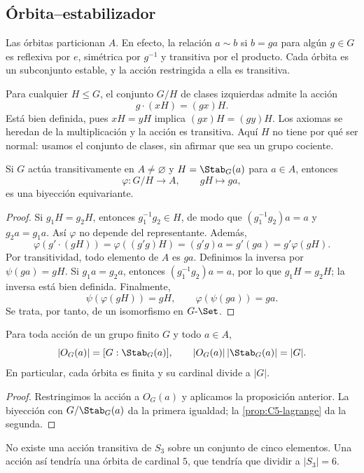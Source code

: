 \subsection{Órbita--estabilizador}
Las órbitas particionan $A$. En efecto, la relación $a\sim b$ si $b=ga$ para algún $g\in G$ es reflexiva por $e$, simétrica por $g^{-1}$ y transitiva por el producto. Cada órbita es un subconjunto estable, y la acción restringida a ella es transitiva.

Para cualquier $H\le G$, el conjunto $G/H$ de clases izquierdas admite la acción
\[
g\cdot(xH)=(gx)H.
\]
Está bien definida, pues $xH=yH$ implica $(gx)H=(gy)H$. Los axiomas se heredan de la multiplicación y la acción es transitiva. Aquí $H$ no tiene por qué ser normal: usamos el conjunto de clases, sin afirmar que sea un grupo cociente.

\begin{prop}\label{prop:C6-transitiva}
Si $G$ actúa transitivamente en $A\ne\varnothing$ y $H=\Stab_G(a)$ para $a\in A$, entonces
\[
\varphi:G/H\to A,\qquad gH\mapsto ga,
\]
es una biyección equivariante.
\end{prop}
\begin{proof}
Si $g_1H=g_2H$, entonces $g_1^{-1}g_2\in H$, de modo que $(g_1^{-1}g_2)a=a$ y $g_2a=g_1a$. Así $\varphi$ no depende del representante. Además,
\[
\varphi(g'\cdot(gH))=\varphi((g'g)H)=(g'g)a
=g'(ga)=g'\varphi(gH).
\]
Por transitividad, todo elemento de $A$ es $ga$. Definimos la inversa por $\psi(ga)=gH$. Si $g_1a=g_2a$, entonces $(g_1^{-1}g_2)a=a$, por lo que $g_1H=g_2H$; la inversa está bien definida. Finalmente,
\[
\psi(\varphi(gH))=gH,\qquad \varphi(\psi(ga))=ga.
\]
Se trata, por tanto, de un isomorfismo en $G\text{-}\Set$.
\end{proof}

\begin{coro}\label{coro:C6-orbita}
Para toda acción de un grupo finito $G$ y todo $a\in A$,
\[
|O_G(a)|=[G:\Stab_G(a)],\qquad
|O_G(a)|\,|\Stab_G(a)|=|G|.
\]
En particular, cada órbita es finita y su cardinal divide a $|G|$.
\end{coro}
\begin{proof}
Restringimos la acción a $O_G(a)$ y aplicamos la proposición anterior. La biyección con $G/\Stab_G(a)$ da la primera igualdad; la \cref{prop:C5-lagrange} da la segunda.
\end{proof}
\begin{ejem}
No existe una acción transitiva de $S_3$ sobre un conjunto de cinco elementos. Una acción así tendría una órbita de cardinal $5$, que tendría que dividir a $|S_3|=6$.
\end{ejem}

